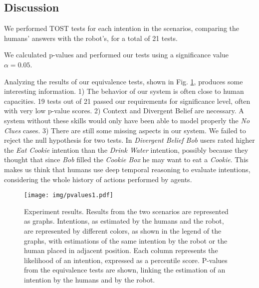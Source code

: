 \subsection{Discussion}
\label{discussion}
We performed TOST tests for each intention in the scenarios, comparing the humans' answers with the robot's, for a total of 21 tests.

We calculated p-values and performed our tests using a significance value $\alpha=0.05$.

Analyzing the results of our equivalence tests, shown in Fig. \ref{fig:user_study_results}, produces some interesting information. 1) The behavior of our system is often close to human capacities. 19 tests out of 21 passed our requirements for significance level, often with very low p-value scores. 2) Context and Divergent Belief are necessary. A system without these skills would only have been able to model properly the \textit{No Clues} cases. 3) There are still some missing aspects in our system. We failed to reject the null hypothesis for two tests. In \textit{Divergent Belief Bob} users rated higher the \textit{Eat Cookie} intention than the \textit{Drink Water} intention, possibly because they thought that since \textit{Bob} filled the \textit{Cookie Box} he may want to eat a \textit{Cookie}. This makes us think that humans use deep temporal reasoning to evaluate intentions, considering the whole history of actions performed by agents.  

 \begin{figure}[h!]
	\centering
	\texttt{[image: img/pvalues1.pdf]}
	\caption{Experiment results. Results from the two scenarios are represented as graphs. Intentions, as estimated by the humans and the robot, are represented by different colors, as shown in the legend of the graphs, with estimations of the same intention by the robot or the human placed in adjacent position. Each column represents the likelihood of an intention, expressed as a percentile score. P-values from the equivalence tests are shown, linking the estimation of an intention by the humans and by the robot.}
	\label{fig:user_study_results}
  	\vspace{-16pt}
\end{figure}



